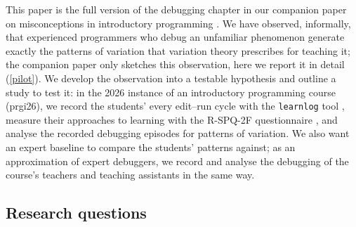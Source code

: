
This paper is the full version of the debugging chapter in our companion paper
on misconceptions in introductory programming
\autocite{VTProgMisconceptions}.
We have observed, informally, that experienced programmers who debug an
unfamiliar phenomenon generate exactly the patterns of variation that
variation theory prescribes for teaching it; the companion paper only
sketches this observation, here we report it in detail (\cref{pilot}).
We develop the observation into a testable hypothesis and outline a
study to test it: in the 2026 instance of an introductory programming course
(prgi26), we record the students' every edit--run cycle with the
\texttt{learnlog} tool \autocite{learnlog}, measure their approaches to
learning with the R-SPQ-2F questionnaire \autocite{RSPQ2F}, and analyse the
recorded debugging episodes for patterns of variation.
We also want an expert baseline to compare the students' patterns against;
as an approximation of expert debuggers, we record and analyse the debugging
of the course's teachers and teaching assistants in the same way.

\subsection{Research questions}

